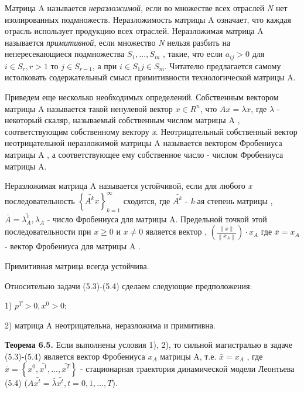 \documentclass[12pt, 4paper]{book}
\begin{document}
{Матрица A называется \textit{неразложимой}, если во множестве всех отраслей \textit{N} нет изолированных подмножеств. Неразложимость матрицы A означает, что каждая отрасль использует продукцию всех отраслей. Неразложимая матрица A называется \textit{примитивной}, если множество \textit{N} нельзя разбить на непересекающиеся подмножества $S_1,...,S_m$ , такие, что если $a_{ij} >0$  для $i \in S_r,r>1 $ то $j \in S_{r-1}$, а при $i \in S_1 j \in S_m$. Читателю предлагается самому истолковать содержательный смысл примитивности технологической матрицы A.
\par

Приведем еще несколько необходимых определений. Собственным вектором матрицы A называется такой ненулевой вектор $x \in R^n$, что $Ax=\lambda x$, где $\lambda$ - некоторый скаляр, называемый собственным числом матрицы A , соответствующим собственному вектору \textit{x}. Неотрицательный собственный вектор неотрицательной неразложимой матрицы A называется вектором Фробениуса матрицы A , а соответствующее ему собственное число - числом Фробениуса матрицы A.
\par

Неразложимая матрица A называется устойчивой, если для любого \textit{x} последовательность $\left\{\bar{A^k}x\right\}_{k=1}^{\infty}$ сходится, где $\bar{A^k}$ - \textit{k}-ая степень матрицы , $\bar{A}=\bar{\lambda_{A}^{1}}, \lambda_{A}$ - число Фробениуса для матрицы A. Предельной точкой этой последовательности при $x \geq 0$ и $x \neq 0$ является вектор , $(\frac{\left\|x\right\|}{\left\|x_A\right\|}) \cdot x_A$ где $\bar{x}=x_A$ - вектор Фробениуса для матрицы A .
\par

Примитивная матрица всегда устойчива.
\par

Относительно задачи (5.3)-(5.4) сделаем следующие предположения:
\par

1) $p^T > 0 ,x^{0}>0$;
\par

2) матрица A неотрицательна, неразложима и примитивна.
\par

\textbf{Теорема 6.5.} Если выполнены условия 1), 2), то сильной магистралью в задаче (5.3)-(5.4) является вектор Фробениуса $x_A$ матрицы A, т.е. $\bar{x}=x_A$ , где $\bar{x}=\left\{x^0,\bar{x^1},...,\bar{x^T}\right\}$ - стационарная траектория динамической модели Леонтьева (5.4) ($A \bar{x^t}=\bar{\lambda}\bar{x^t}, t=0,1,...,T$).
\par

}
\end{document}
